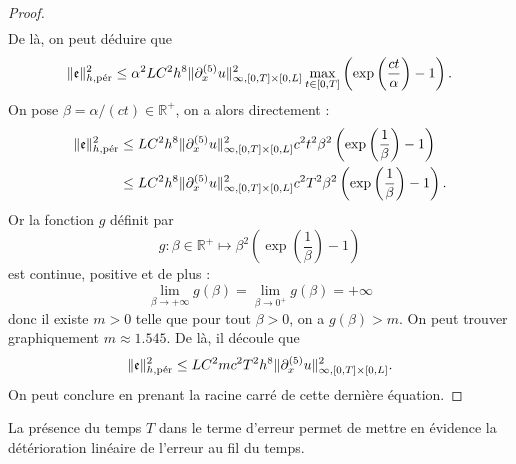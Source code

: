 \begin{proof}
\begin{align*}
\end{align*}
De là, on peut déduire que
\begin{equation}
\|\mathfrak{e}\|_{h,\per}^2 \leq \alpha^2 L C^2 h^8  \| \partial_x^{(5)} u \|_{\infty,[0,T] \times [0,L]}^2 \max_{t \in [0,T]} \left( \exp \left( \dfrac{ct}{\alpha} \right) -1  \right).
\end{equation}
On pose $\beta = \alpha/(ct) \in \mathbb{R}^+$, on a alors directement :
\begin{align*}
\|\mathfrak{e}\|_{h,\per}^2 & \leq L C^2 h^8  \| \partial_x^{(5)} u \|_{\infty,[0,T] \times [0,L]}^2 c^2 t^2 \beta^2 \left( \exp \left( \dfrac{1}{\beta} \right) -1  \right) \\
      & \leq L C^2 h^8  \| \partial_x^{(5)} u \|_{\infty,[0,T] \times [0,L]}^2 c^2 T^2 \beta^2 \left( \exp \left( \dfrac{1}{\beta} \right) -1  \right).
\end{align*}
Or la fonction $g$ définit par
\begin{equation}
g :\beta \in \mathbb{R}^+ \mapsto \beta^2 \left( \exp \left( \dfrac{1}{\beta} \right) -1  \right)
\end{equation}
est continue, positive et de plus :
\begin{equation}
\lim_{\beta \rightarrow + \infty} g(\beta) = \lim_{\beta \rightarrow 0^+} g(\beta) = + \infty
\end{equation}
donc il existe $m > 0$ telle que pour tout $\beta > 0$, on a $g(\beta)>m$. On peut trouver graphiquement $m \approx 1.545$. De là, il découle que
\begin{equation*}
\|\mathfrak{e}\|_{h,\per}^2 \leq L C^2 m c^2 T^2 h^8  \| \partial_x^{(5)} u \|_{\infty,[0,T] \times [0,L]}^2.
\end{equation*}
On peut conclure en prenant la racine carré de cette dernière équation.
\end{proof}

La présence du temps $T$ dans le terme d'erreur permet de mettre en évidence la détérioration linéaire de l'erreur au fil du temps. 

